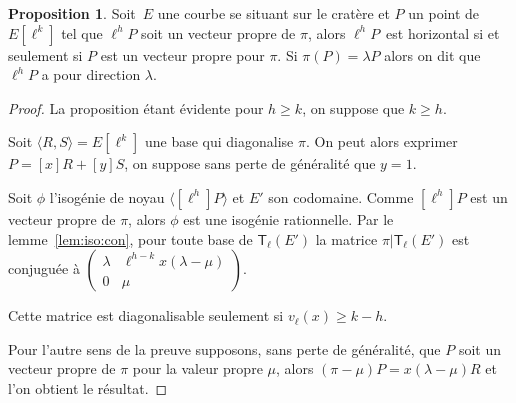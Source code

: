 \documentclass[10pt,a4paper]{book}
\theoremstyle{plain}
\theoremstyle{definition}
\theoremstyle{definition}
\theoremstyle{definition}
\theoremstyle{definition}
\newtheorem{prop}[thm]{Proposition}
\theoremstyle{definition}
\theoremstyle{remark}
\theoremstyle{remark}
\theoremstyle{definition}
\begin{document}

\begin{prop} \label{pro:dia:hor}
Soit~$E$ une courbe se situant sur le cratère et $P$ un point de $E[\ell^k]$
tel que $\ell^h P$ soit un vecteur propre de $\pi$, 
alors $\ell^hP$~est horizontal si et seulement si $P$ est un vecteur propre pour $\pi$.
Si $\pi(P)=\lambda P$ alors on dit que $\ell^h P$ a pour direction $\lambda$.
\end{prop}

\begin{proof}
La proposition étant évidente pour $h \geqslant k$,
on suppose que $k \geqslant h$.

Soit $\langle R,S \rangle =E[\ell^k]$ une base qui diagonalise $\pi$.
On peut alors exprimer $P=[x]R+[y]S$, on suppose sans perte de généralité
que $y=1$.

Soit $\phi$ l'isogénie de noyau $\langle [\ell^h]P \rangle$ et $E'$ son 
codomaine. Comme $[\ell^h]P$ est un vecteur propre de $\pi$, alors $\phi$ est 
une isogénie rationnelle. Par le lemme~\ref{lem:iso:con}, pour toute base de 
$\mathsf{T}_{\ell}(E')$ la matrice 
$\pi|\mathsf{T}_{\ell}(E')$ est conjuguée à $\left ( \begin{smallmatrix}\lambda & \ell^{h-k} 
x (\lambda-\mu)\\ 0 & \mu \end{smallmatrix}\right )$.  

Cette matrice est diagonalisable seulement si $v_{\ell}(x) \geqslant k - h$.

Pour l'autre sens de la preuve supposons, sans perte de généralité, que $P$ soit 
un vecteur propre de $\pi$ pour la valeur propre $\mu$, alors 
$(\pi - \mu) P = x (\lambda - \mu) R$ et l'on obtient le résultat.
\end{proof}
\end{document}
